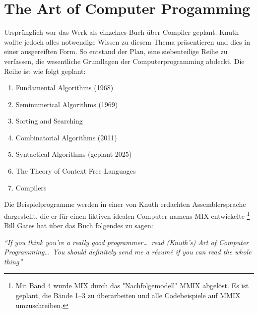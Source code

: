 \documentclass[a4paper. 11pts]{scrartcl}
\begin{document}
\section{The Art of Computer Progamming}
Ursprünglich war das Werk als einzelnes Buch über Compiler geplant. Knuth wollte jedoch alles notwendige Wissen zu diesem Thema präsentieren und dies in einer ausgereiften Form. So entstand der Plan, eine siebenteilige Reihe zu verfassen, die wesentliche Grundlagen der Computerprogramming abdeckt. Die Reihe ist wie folgt geplant:
\begin{enumerate}
	\item Fundamental Algorithms (1968)
	\item Seminumerical Algorithms (1969)
	\item Sorting and Searching
	\item Combinatorial Algorithms (2011)
	\item Syntactical Algorithms (geplant 2025)
	\item The Theory of Context Free Languages
	\item Compilers
\end{enumerate}
Die Beispielprogramme werden in einer von Knuth erdachten Assemblersprache dargestellt, die er für einen fiktiven \glqq idealen \grqq Computer namens \textsc{MIX} entwickelte \footnote{Mit Band 4 wurde \textsc{MIX} durch das "Nachfolgemodell" \textsc{MMIX} abgelöst. Es ist geplant, die Bände 1--3 zu überarbeiten und alle Codebeispiele auf \textsc{MMIX} umzuschreiben.}
Bill Gates hat über das Buch folgendes zu sagen: 
\begin{center}
\emph{``If you think you're a really good programmer\dots\ read (Knuth's) \emph{Art of Computer Programming}\dots\ You should definitely send me a r\'{e}sum\'{e} if you can read the whole thing''}
\end{center}
\end{document}
